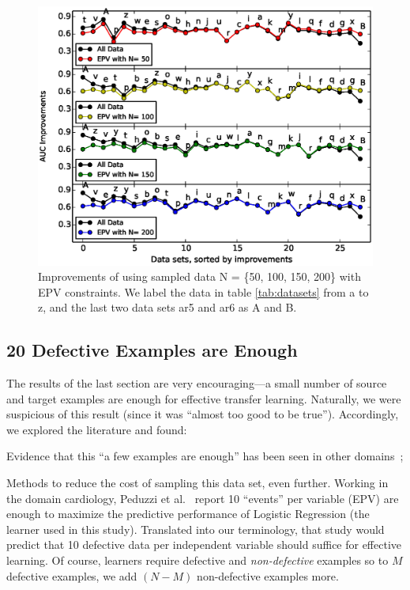 \begin{figure}[t]
	\centering
	\includegraphics[width=\linewidth]{Figures/raleigh/sample_epv.eps}
	\caption{Improvements of using sampled data N  = \{50, 100, 150, 200\} with EPV constraints. We label the data in table \ref{tab:datasets} from a to z, and the last two data sets ar5 and ar6 as A and B.}
	\label{fig:small_epv}
\end{figure}


\subsection{20 Defective Examples  are Enough}


The results of the last section are very encouraging---a small number of source
and target examples are enough for effective transfer learning. Naturally,
we were suspicious of this result (since it was ``almost too good to be true'').
Accordingly, we explored the literature and found:
\bi
\item Evidence that this ``a few examples are enough'' has been seen in other domains~\cite{peduzzi1996simulation}; 
\item Methods to reduce the cost of sampling this data set, even further. 
  \ei
Working in the domain cardiology,
  Peduzzi et al.~\cite{peduzzi1996simulation}
  report 10 ``events'' per variable (EPV) are enough to maximize the predictive performance
  of  Logistic Regression (the learner used in this study). Translated into our terminology,
  that study would predict that  10 defective data per independent variable should
  suffice for effective learning. Of course, learners require defective and {\em non-defective}
  examples so to $M$ defective examples, we add $(N-M)$ non-defective examples more.

